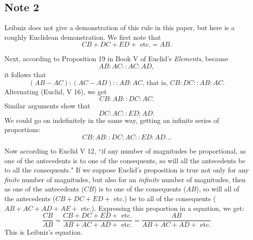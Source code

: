 \documentclass[twoside,openright]{article}
\begin{document}
\subsection*{Note 2}
\label{caa2}

Leibniz does not give a demonstration of this rule in this paper, but here is a roughly Euclidean demonstration.
We first note that
$$CB + DC + ED + \mbox{ etc.} = AB.$$

Next, according to Proposition 19 in Book V of Euclid's {\em Elements}, because 
$$AB\!:\!AC :: AC\!:\!AD,$$
it follows that 
$$(AB-AC)\!:\!(AC-AD) :: AB\!:\!AC\mbox{, that is, } CB\!:\!DC :: AB\!:\!AC.$$
Alternating (Euclid, V 16), we get
$$CB\!:\!AB :: DC\!:\!AC.$$
Similar arguments show that 
$$ DC\!:\!AC :: ED\!:\!AD.$$  We could go on indefinitely in the same way, getting an infinite series of proportions:
$$CB\!:\!AB :: DC\!:\!AC :: ED\!:\!AD \ldots$$


Now according to Euclid V 12, ``if any number of magnitudes be proportional, as one of the antecedents is to one of the consequents, so will all the antecedents be to all the consequents."  If we suppose Euclid's proposition is true not only for any {\em finite} number of magnitudes, but also for an {\em infinite} number of magnitudes, then as one of the antecedents ($CB$) is to one of the consequents ($AB$), so will all of the antecedents ($CB + DC + ED +$ etc.) be to all of the consequents ($AB + AC + AD + AE +$ etc.).  Expressing this proportion in a equation, we get:
$$\frac{CB}{AB} = \frac{CB + DC + ED + \mbox{ etc.}}{AB + AC + AD + \mbox{ etc.} } = \frac{AB}{AB + AC + AD + \mbox{ etc.}}$$
This is Leibniz's equation.
\end{document}
